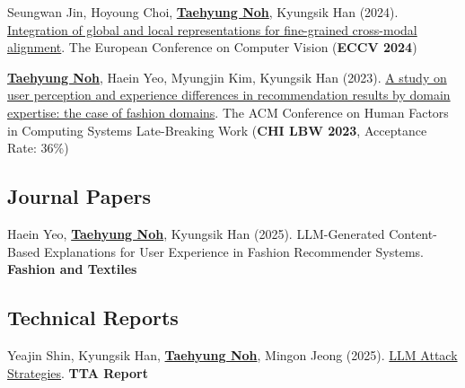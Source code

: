 \documentclass[a4paper,11pt]{article}
\begin{document}
{\begin{enumerate}[leftmargin=*, labelsep=0.5em, align=left, widest={[\textbf{C.1}]}, itemindent=0em, label={\textbf{[C.\arabic*]}}]
\item Seungwan Jin, Hoyoung Choi, \underline{\textbf{Taehyung Noh}}, Kyungsik Han (2024). \href{https://link.springer.com/chapter/10.1007/978-3-031-73010-8_4}{Integration of global and local representations for fine-grained cross-modal alignment}. The European Conference on Computer Vision (\textbf{ECCV 2024})

\item \underline{\textbf{Taehyung Noh}}, Haein Yeo, Myungjin Kim, Kyungsik Han (2023). \href{https://dl.acm.org/doi/abs/10.1145/3544549.3585641}{A study on user perception and experience differences in recommendation results by domain expertise: the case of fashion domains}. The ACM Conference on Human Factors in Computing Systems Late-Breaking Work (\textbf{CHI LBW 2023}, Acceptance Rate: 36\%)

\end{enumerate}
}

\subsection*{\textbf{Journal Papers}}
\vspace{-2mm}
\small{
\begin{enumerate}[leftmargin=*, labelsep=0.5em, align=left, widest={[\textbf{J.1}]}, itemindent=0em, label={\textbf{[J.\arabic*]}}]

\item Haein Yeo, \underline{\textbf{Taehyung Noh}}, Kyungsik Han (2025). LLM-Generated Content-Based Explanations for User Experience in Fashion Recommender Systems. \textbf{Fashion and Textiles}

\end{enumerate}
}

\subsection*{\textbf{Technical Reports}}
\vspace{-2mm}
\small{
\begin{enumerate}[leftmargin=*, labelsep=0.5em, align=left, widest={[\textbf{R.1}]}, itemindent=0em, label={\textbf{[R.\arabic*]}}]

\item Yeajin Shin, Kyungsik Han, \underline{\textbf{Taehyung Noh}}, Mingon Jeong (2025). \href{https://astlyi.s3.ap-northeast-2.amazonaws.com/2025/TTA_LLM+\%E1\%84\%8B\%E1\%85\%B2\%E1\%84\%92\%E1\%85\%A2\%E1\%84\%89\%E1\%85\%A5\%E1\%86\%BC+\%E1\%84\%80\%E1\%85\%A9\%E1\%86\%BC\%E1\%84\%80\%E1\%85\%A7\%E1\%86\%A8+\%E1\%84\%8C\%E1\%85\%A5\%E1\%86\%AB\%E1\%84\%85\%E1\%85\%A3\%E1\%86\%A8\%E1\%84\%8B\%E1\%85\%A6+\%E1\%84\%83\%E1\%85\%A2\%E1\%84\%92\%E1\%85\%A1\%E1\%86\%AB+\%E1\%84\%89\%E1\%85\%B5\%E1\%86\%AF\%E1\%84\%8C\%E1\%85\%B3\%E1\%86\%BC\%E1\%84\%8C\%E1\%85\%A5\%E1\%86\%A8+\%E1\%84\%87\%E1\%85\%AE\%E1\%86\%AB\%E1\%84\%89\%E1\%85\%A5\%E1\%86\%A8.pdf}{LLM Attack Strategies}. \textbf{TTA Report}

\end{enumerate}
}
\vspace{-3mm}
\end{document}
